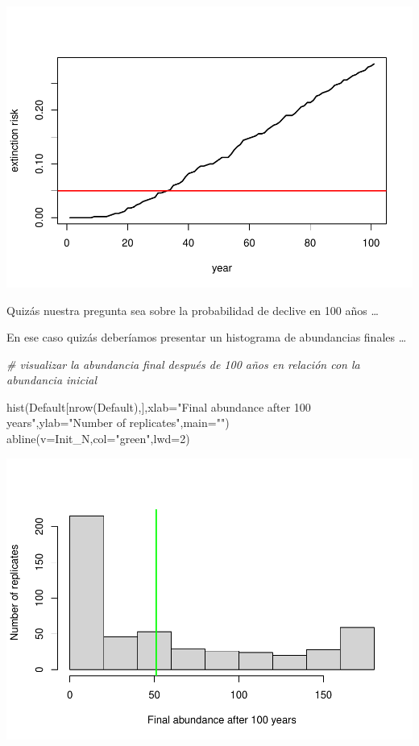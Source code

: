 \documentclass[
]{article}
\newenvironment{Shaded}{\begin{snugshade}}{\end{snugshade}}
\newcommand{\AttributeTok}[1]{\textcolor[rgb]{0.77,0.63,0.00}{#1}}
\newcommand{\CommentTok}[1]{\textcolor[rgb]{0.56,0.35,0.01}{\textit{#1}}}
\newcommand{\DecValTok}[1]{\textcolor[rgb]{0.00,0.00,0.81}{#1}}
\newcommand{\FunctionTok}[1]{\textcolor[rgb]{0.00,0.00,0.00}{#1}}
\newcommand{\NormalTok}[1]{#1}
\newcommand{\StringTok}[1]{\textcolor[rgb]{0.31,0.60,0.02}{#1}}
\begin{document}
\includegraphics{LECTURE12_files/figure-latex/unnamed-chunk-6-1.pdf}

Quizás nuestra pregunta sea sobre la probabilidad de declive en 100 años
\ldots{}

En ese caso quizás deberíamos presentar un histograma de abundancias
finales \ldots{}

\begin{Shaded}
\begin{Highlighting}[]
\CommentTok{\# visualizar la abundancia final después de 100 años en relación con la abundancia inicial}

\FunctionTok{hist}\NormalTok{(Default[}\FunctionTok{nrow}\NormalTok{(Default),],}\AttributeTok{xlab=}\StringTok{"Final abundance after 100 years"}\NormalTok{,}\AttributeTok{ylab=}\StringTok{"Number of replicates"}\NormalTok{,}\AttributeTok{main=}\StringTok{""}\NormalTok{)}
\FunctionTok{abline}\NormalTok{(}\AttributeTok{v=}\NormalTok{Init\_N,}\AttributeTok{col=}\StringTok{"green"}\NormalTok{,}\AttributeTok{lwd=}\DecValTok{2}\NormalTok{)}
\end{Highlighting}
\end{Shaded}

\includegraphics{LECTURE12_files/figure-latex/unnamed-chunk-7-1.pdf}
\end{document}
